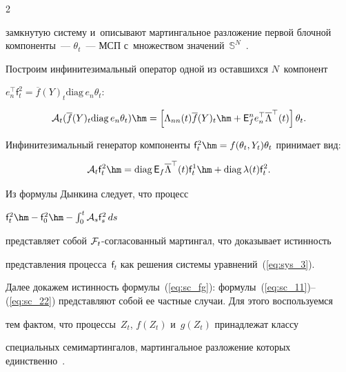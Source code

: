 \begin{multicols}{2}
{замкнутую систему и~описывают мартингальное разложение первой блочной компоненты~--- $\theta_t$~--- МСП с~множеством значений~$\mathbb{S}^N$~\cite{EAM_10}.





 Построим инфинитезимальный оператор одной из оставшихся $N$~компонент


   $e_n^{\top} \mathsf{f}^2_t= \overline{f}(Y)_t \mathrm{diag}\,e_n \theta_t


   $:


   $$


   \mathcal{A}_t(\overline{f}(Y)_t \mathrm{diag}\,e_n \theta_t)\hm =


  \left[


  \Lambda_{nn}(t)\overline{f}(Y)_t\hm + {\mathsf E}_f^n e_n^{\top} 


\overline{\Lambda}^{\top}(t)


  \right] \theta_t.


  $$


   Инфинитезимальный генератор компоненты $\mathsf{f}^2_t \hm= 


f(\theta_t,Y_t)\theta_t$ принимает вид:


$$  


 \mathcal{A}_t\mathsf{f}^2_t \hm= \mathrm{diag}\,{\mathsf E}_f \overline{\Lambda}^{\top}(t) 


\mathsf{f}^1_t \hm+ \mathrm{diag}\,\lambda(t) \mathsf{f}^2_t.


$$


   Из формулы Дынкина следует, что процесс


   $   \mathsf{f}^2_t \hm- \mathsf{f}^2_0\hm - \int\nolimits_0^t \mathcal{A}_s\mathsf{f}^2_s \,ds$


   представляет собой ${\mathcal F}_t$-со\-гла\-со\-ван\-ный мартингал, что доказывает истинность 


представления процесса~$\mathsf{f}_t$ как решения системы уравнений~(\ref{eq:sys_3}).





   Далее докажем истинность формулы~(\ref{eq:sc_fg}): формулы~(\ref{eq:sc_11})--(\ref{eq:sc_22}) представляют собой ее частные случаи. Для этого воспользуемся 


тем фактом, что процессы~$Z_t$, $f(Z_t)$ и~$g(Z_t)$ принадлежат классу 


специальных семимартингалов, мартингальное разложение которых единственно~\cite{LSh_86}.





}
\end{multicols}
